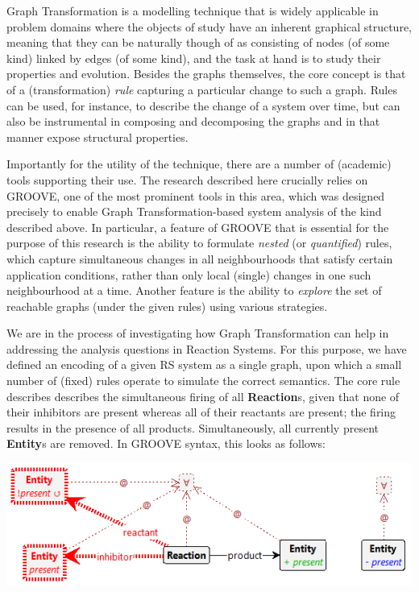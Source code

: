 \documentclass{llncs}
\newcommand{\lab}[1]{\textsf{#1}}
\newcommand{\blab}[1]{\lab{\bfseries #1}}
\begin{document}
Graph Transformation is a modelling technique that is widely applicable in problem domains where the objects of study have an inherent graphical structure, meaning that they can be naturally though of as consisting of nodes (of some kind) linked by edges (of some kind), and the task at hand is to study their properties and evolution. Besides the graphs themselves, the core concept is that of a (transformation) \emph{rule} capturing a particular change to such a graph. Rules can be used, for instance, to describe the change of a system over time, but can also be instrumental in composing and decomposing the graphs and in that manner expose structural properties.

Importantly for the utility of the technique, there are a number of (academic) tools supporting their use. The research described here crucially relies on GROOVE, one of the most prominent tools in this area, which was designed precisely to enable Graph Transformation-based system analysis of the kind described above. In particular, a feature of GROOVE that is essential for the purpose of this research is the ability to formulate \emph{nested} (or \emph{quantified}) rules, which capture simultaneous changes in all neighbourhoods that satisfy certain application conditions, rather than only local (single) changes in one such neighbourhood at a time. Another feature is the ability to \emph{explore} the set of reachable graphs (under the given rules) using various strategies.

We are in the process of investigating how Graph Transformation can help in addressing the analysis questions in Reaction Systems. For this purpose, we have defined an encoding of a given RS system as a single graph, upon which a small number of (fixed) rules operate to simulate the correct semantics. The core rule describes describes the simultaneous firing of all \blab{Reaction}s, given that none of their \lab{inhibitor}s are present whereas all of their \lab{reactant}s are present; the firing results in the presence of all \lab{product}s. Simultaneously, all currently present \blab{Entity}s are removed. In GROOVE syntax, this looks as follows:

\begin{center}
\includegraphics[scale=.6]{react}
\end{center}
\end{document}

